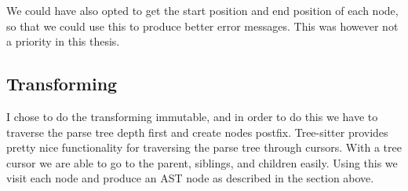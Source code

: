 We could have also opted to get the start position and end position of each node, so that we could use this to produce better error messages.
This was however not a priority in this thesis.

\subsection{Transforming}\label{subsec:transforming}

I chose to do the transforming immutable, and in order to do this we have to traverse the parse tree depth first and create nodes postfix.
Tree-sitter provides pretty nice functionality for traversing the parse tree through cursors.
With a tree cursor we are able to go to the parent, siblings, and children easily.
Using this we visit each node and produce an AST node as described in the section above.